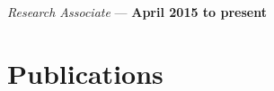 \documentclass[margin,line]{res}
\newenvironment{list2}{
  \begin{list}{$\bullet$}{%
      \setlength{\itemsep}{0in}
      \setlength{\parsep}{0in} \setlength{\parskip}{0in}
      \setlength{\topsep}{0in} \setlength{\partopsep}{0in} 
      \setlength{\leftmargin}{0.2in}}}{\end{list}}
\begin{document}
\begin{resume}
\vspace{-.3cm}
{\em Research Associate} --- {\bf April 2015 to present}%



 

 
\section{\sc Publications}
%
%
%
\begin{refsection}[publications]
\nocite{*}
\printbibliography
\end{refsection}


\end{resume}
\end{document}

